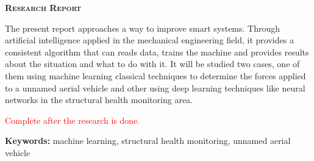 \begin{center}
	\vspace{100pt}
	{\Large\scshape\bfseries Research Report}
\end{center}
\noindent
The present report approaches a way to improve smart systems. Through artificial intelligence applied in the mechanical engineering field, it provides a consistent algorithm that can reads data, trains the machine and provides results about the situation and what to do with it. It will be studied two cases, one of them using machine learning classical techniques to determine the forces applied to a unnamed aerial vehicle and other using deep learning techniques like neural networks in the structural health monitoring area. 

\noindent
\textcolor{red}{Complete after the research is done.}

\noindent
{\bfseries Keywords:} machine learning, structural health monitoring, unnamed aerial vehicle

\clearpage